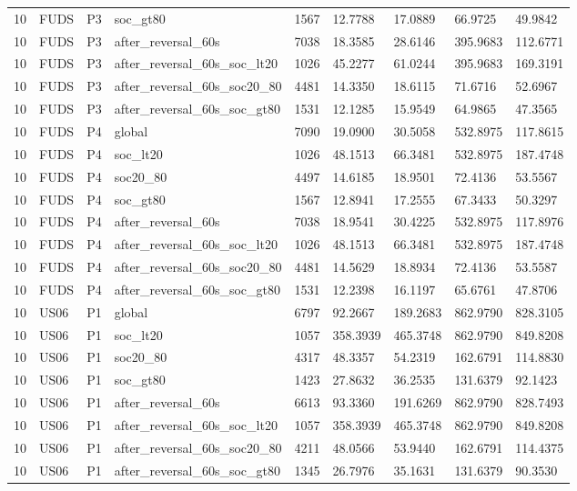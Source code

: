 \begin{tabular}{lllllllll}
10 & FUDS & P3 & soc\_gt80 & 1567 & 12.7788 & 17.0889 & 66.9725 & 49.9842 \\
10 & FUDS & P3 & after\_reversal\_60s & 7038 & 18.3585 & 28.6146 & 395.9683 & 112.6771 \\
10 & FUDS & P3 & after\_reversal\_60s\_soc\_lt20 & 1026 & 45.2277 & 61.0244 & 395.9683 & 169.3191 \\
10 & FUDS & P3 & after\_reversal\_60s\_soc20\_80 & 4481 & 14.3350 & 18.6115 & 71.6716 & 52.6967 \\
10 & FUDS & P3 & after\_reversal\_60s\_soc\_gt80 & 1531 & 12.1285 & 15.9549 & 64.9865 & 47.3565 \\
10 & FUDS & P4 & global & 7090 & 19.0900 & 30.5058 & 532.8975 & 117.8615 \\
10 & FUDS & P4 & soc\_lt20 & 1026 & 48.1513 & 66.3481 & 532.8975 & 187.4748 \\
10 & FUDS & P4 & soc20\_80 & 4497 & 14.6185 & 18.9501 & 72.4136 & 53.5567 \\
10 & FUDS & P4 & soc\_gt80 & 1567 & 12.8941 & 17.2555 & 67.3433 & 50.3297 \\
10 & FUDS & P4 & after\_reversal\_60s & 7038 & 18.9541 & 30.4225 & 532.8975 & 117.8976 \\
10 & FUDS & P4 & after\_reversal\_60s\_soc\_lt20 & 1026 & 48.1513 & 66.3481 & 532.8975 & 187.4748 \\
10 & FUDS & P4 & after\_reversal\_60s\_soc20\_80 & 4481 & 14.5629 & 18.8934 & 72.4136 & 53.5587 \\
10 & FUDS & P4 & after\_reversal\_60s\_soc\_gt80 & 1531 & 12.2398 & 16.1197 & 65.6761 & 47.8706 \\
10 & US06 & P1 & global & 6797 & 92.2667 & 189.2683 & 862.9790 & 828.3105 \\
10 & US06 & P1 & soc\_lt20 & 1057 & 358.3939 & 465.3748 & 862.9790 & 849.8208 \\
10 & US06 & P1 & soc20\_80 & 4317 & 48.3357 & 54.2319 & 162.6791 & 114.8830 \\
10 & US06 & P1 & soc\_gt80 & 1423 & 27.8632 & 36.2535 & 131.6379 & 92.1423 \\
10 & US06 & P1 & after\_reversal\_60s & 6613 & 93.3360 & 191.6269 & 862.9790 & 828.7493 \\
10 & US06 & P1 & after\_reversal\_60s\_soc\_lt20 & 1057 & 358.3939 & 465.3748 & 862.9790 & 849.8208 \\
10 & US06 & P1 & after\_reversal\_60s\_soc20\_80 & 4211 & 48.0566 & 53.9440 & 162.6791 & 114.4375 \\
10 & US06 & P1 & after\_reversal\_60s\_soc\_gt80 & 1345 & 26.7976 & 35.1631 & 131.6379 & 90.3530 \\

\end{tabular}
